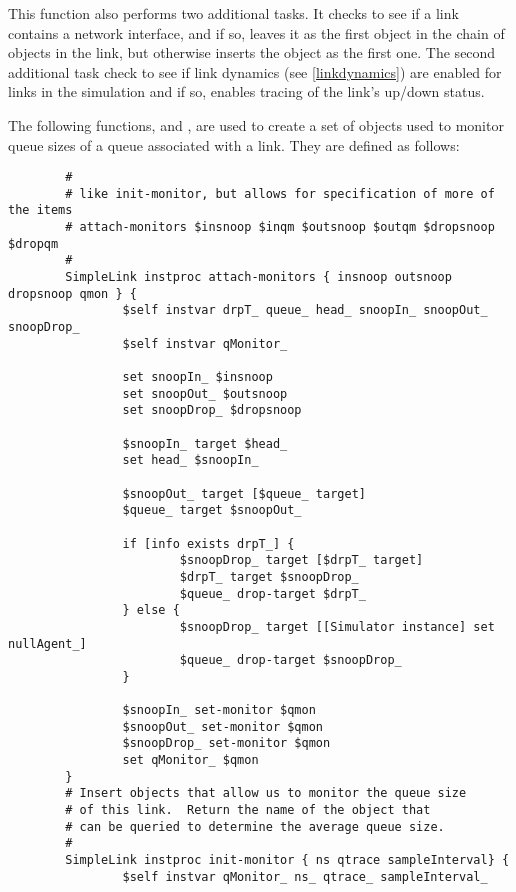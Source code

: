 This function also performs two additional tasks.
It checks to see if a link contains a network interface,
and if so, leaves it as the first object in the chain of objects
in the link, but otherwise inserts the  object as
the first one.
The second additional task check to see if link dynamics
(see \ref{linkdynamics}) are enabled for links in the simulation
and if so, enables tracing of the link's up/down status.



The following functions,  and
, are used to create a set of
objects used to monitor queue sizes of a queue associated
with a link.
They are defined as follows:
\begin{small}
\begin{verbatim}
        #
        # like init-monitor, but allows for specification of more of the items
        # attach-monitors $insnoop $inqm $outsnoop $outqm $dropsnoop $dropqm
        #
        SimpleLink instproc attach-monitors { insnoop outsnoop dropsnoop qmon } {
                $self instvar drpT_ queue_ head_ snoopIn_ snoopOut_ snoopDrop_
                $self instvar qMonitor_

                set snoopIn_ $insnoop
                set snoopOut_ $outsnoop
                set snoopDrop_ $dropsnoop

                $snoopIn_ target $head_
                set head_ $snoopIn_

                $snoopOut_ target [$queue_ target]
                $queue_ target $snoopOut_

                if [info exists drpT_] {
                        $snoopDrop_ target [$drpT_ target]
                        $drpT_ target $snoopDrop_
                        $queue_ drop-target $drpT_
                } else {
                        $snoopDrop_ target [[Simulator instance] set nullAgent_]
                        $queue_ drop-target $snoopDrop_
                }

                $snoopIn_ set-monitor $qmon
                $snoopOut_ set-monitor $qmon
                $snoopDrop_ set-monitor $qmon
                set qMonitor_ $qmon
        }
        # Insert objects that allow us to monitor the queue size
        # of this link.  Return the name of the object that
        # can be queried to determine the average queue size.
        #
        SimpleLink instproc init-monitor { ns qtrace sampleInterval} {
                $self instvar qMonitor_ ns_ qtrace_ sampleInterval_


\end{verbatim}
\end{small}
